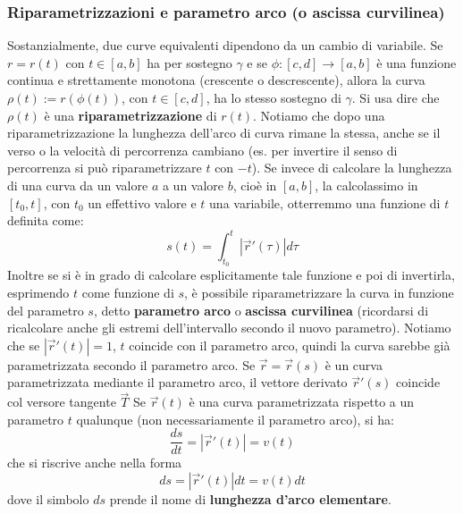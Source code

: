 \subsubsection{Riparametrizzazioni e parametro arco (o ascissa curvilinea)}
Sostanzialmente, due curve equivalenti dipendono da un cambio di variabile. Se $r = r(t)$ con $t \in[a,b]$ ha per sostegno $\gamma$ e se $\phi: [c,d] \rightarrow [a,b]$ è una funzione continua e strettamente monotona (crescente o descrescente), allora la curva $\rho(t) := r(\phi(t))$, con $t \in [c,d]$, ha lo stesso sostegno di $\gamma$. Si usa dire che $\rho(t)$ è una \textbf{riparametrizzazione} di $r(t)$.\newline
Notiamo che dopo una riparametrizzazione la lunghezza dell'arco di curva rimane la stessa, anche se il verso o la velocità di percorrenza cambiano (es. per invertire il senso di percorrenza si può riparametrizzare $t$ con $-t$).\newline
\newline
Se invece di calcolare la lunghezza di una curva da un valore $a$ a un valore $b$, cioè in $[a,b]$, la calcolassimo in $[t_0, t]$, con $t_0$ un effettivo valore e $t$ una variabile, otterremmo una funzione di $t$ definita come:
\[
    s(t) = \int_{t_0}^{t}|\vec{r}'(\tau)|d\tau
\]
Inoltre se si è in grado di calcolare esplicitamente tale funzione e poi di invertirla, esprimendo $t$ come funzione di $s$, è possibile riparametrizzare la curva in funzione del parametro $s$, detto \textbf{parametro arco} o \textbf{ascissa curvilinea} (ricordarsi di ricalcolare anche gli estremi dell'intervallo secondo il nuovo parametro).\newline
\newline
Notiamo che se $|\vec{r}'(t)| = 1$, $t$ coincide con il parametro arco, quindi la curva sarebbe già parametrizzata secondo  il parametro arco.\newline
\newline
Se $\vec{r} = \vec{r}(s)$ è un curva parametrizzata mediante il parametro arco, il vettore derivato $\vec{r}'(s)$ coincide col versore tangente $\vec{T}$
\newline
\newline
Se $\vec{r}(t)$ è una curva parametrizzata rispetto a un parametro $t$ qualunque (non necessariamente il parametro arco), si ha:
\[
    \frac{ds}{dt} =|\vec{r}'(t)| = v(t)
\]
che si riscrive anche nella forma
\[
    ds =|\vec{r}'(t)|dt =v(t) dt
\] 
dove il simbolo $ds$ prende il nome di \textbf{lunghezza d'arco elementare}.
